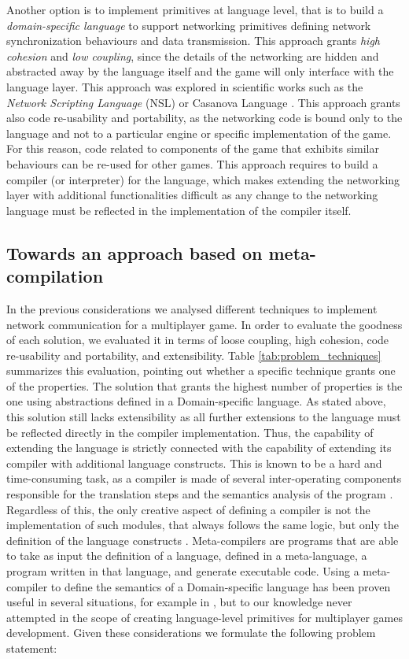 Another option is to implement primitives at language level, that is to build a \textit{domain-specific language} to support networking primitives defining network synchronization behaviours and data transmission. This approach grants \textit{high cohesion} and \textit{low coupling}, since the details of the networking are hidden and abstracted away by the language itself and the game will only interface with the language layer. This approach was explored in scientific works such as the \textit{Network Scripting Language} (NSL) \cite{russell2008tackling} or Casanova Language \cite{Giacomo2017}. This approach grants also code re-usability and portability, as the networking code is bound only to the language and not to a particular engine or specific implementation of the game. For this reason, code related to components of the game that exhibits similar behaviours can be re-used for other games. This approach requires to build a compiler (or interpreter) for the language, which makes extending the networking layer with additional functionalities difficult as any change to the networking language must be reflected in the implementation of the compiler itself.

\subsection{Towards an approach based on meta-compilation}

In the previous considerations we analysed different techniques to implement network communication for a multiplayer game. In order to evaluate the goodness of each solution, we evaluated it in terms of loose coupling, high cohesion, code re-usability and portability, and extensibility. Table \ref{tab:problem_techniques} summarizes this evaluation, pointing out whether a specific technique grants one of the properties. The solution that grants the highest number of properties is the one using abstractions defined in a Domain-specific language. As stated above, this solution still lacks extensibility as all further extensions to the language must be reflected directly in the compiler implementation. Thus, the capability of extending the language is strictly connected with the capability of extending its compiler with additional language constructs. This is known to be a hard and time-consuming task, as a compiler is made of several inter-operating components responsible for the translation steps and the semantics analysis of the program \cite{aho1986compilers, kaagedal1998generating}. Regardless of this, the only creative aspect of defining a compiler is not the implementation of such modules, that always follows the same logic, but only the definition of the language constructs \cite{BookShorre}. Meta-compilers are programs that are able to take as input the definition of a language, defined in a meta-language, a program written in that language, and generate executable code. Using a meta-compiler to define the semantics of a Domain-specific language has been proven useful in several situations, for example in \cite{kaagedal1998generating, DiGiacomo2017}, but to our knowledge never attempted in the scope of creating language-level primitives for multiplayer games development. Given these considerations we formulate the following problem statement:

